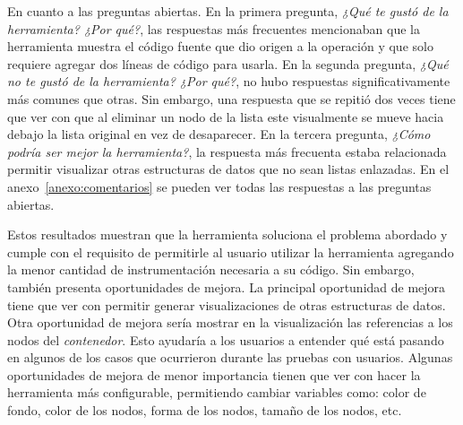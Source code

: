 En cuanto a las preguntas abiertas. En la primera pregunta, \textit{¿Qué te gustó de la herramienta? ¿Por qué?}, las respuestas más frecuentes mencionaban que la herramienta muestra el código fuente que dio origen a la operación y que solo requiere agregar dos líneas de código para usarla. En la segunda pregunta, \textit{¿Qué no te gustó de la herramienta? ¿Por qué?}, no hubo respuestas significativamente más comunes que otras. Sin embargo, una respuesta que se repitió dos veces tiene que ver con que al eliminar un nodo de la lista este visualmente se mueve hacia debajo la lista original en vez de desaparecer. En la tercera pregunta, \textit{¿Cómo podría ser mejor la herramienta?}, la respuesta más frecuenta estaba relacionada permitir visualizar otras estructuras de datos que no sean listas enlazadas. En el anexo~\ref{anexo:comentarios} se pueden ver todas las respuestas a las preguntas abiertas.

Estos resultados muestran que la herramienta soluciona el problema abordado y cumple con el requisito de permitirle al usuario utilizar la herramienta agregando la menor cantidad de instrumentación necesaria a su código. Sin embargo, también presenta oportunidades de mejora. La principal oportunidad de mejora tiene que ver con permitir generar visualizaciones de otras estructuras de datos. Otra oportunidad de mejora sería mostrar en la visualización las referencias a los nodos del \textit{contenedor}. Esto ayudaría a los usuarios a entender qué está pasando en algunos de los casos que ocurrieron durante las pruebas con usuarios. Algunas oportunidades de mejora de menor importancia tienen que ver con hacer la herramienta más configurable, permitiendo cambiar variables como: color de fondo, color de los nodos, forma de los nodos, tamaño de los nodos, etc.
